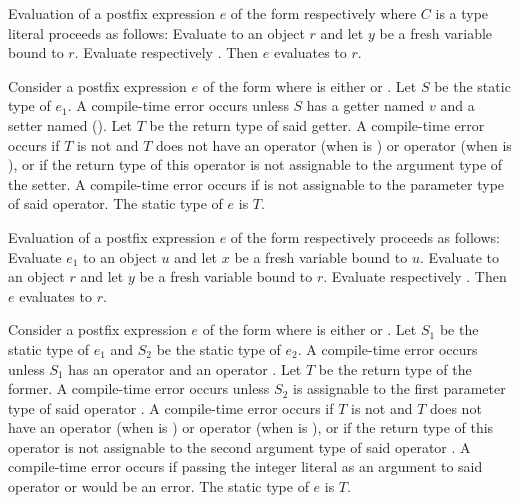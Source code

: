 \documentclass[makeidx]{article}
\begin{document}
{\LMHash{}%
Evaluation of a postfix expression $e$
of the form  respectively 
where $C$ is a type literal proceeds as follows:
Evaluate  to an object $r$
and let $y$ be a fresh variable bound to $r$.
Evaluate  respectively .
Then $e$ evaluates to $r$.
\EndCase

\LMHash{}%
Consider a postfix expression $e$ of the form 
where \op{} is either \lit{++} or \lit{-{}-}.
Let $S$ be the static type of $e_1$.
A compile-time error occurs unless $S$ has
a getter named $v$ and a setter named 
().
Let $T$ be the return type of said getter.
A compile-time error occurs if $T$ is not \DYNAMIC{}
and $T$ does not have an operator \lit{+} (when \op{} is \lit{++})
or operator \lit{-} (when \op{} is \lit{-{}-}),
or if the return type of this operator is not assignable to
the argument type of the setter.
A compile-time error occurs if  is not assignable to
the parameter type of said operator.
The static type of $e$ is $T$.

\LMHash{}%
Evaluation of a postfix expression $e$
of the form  respectively 
proceeds as follows:
Evaluate $e_1$ to an object $u$ and let $x$ be a fresh variable bound to $u$.
Evaluate  to an object $r$
and let $y$ be a fresh variable bound to $r$.
Evaluate  respectively .
Then $e$ evaluates to $r$.
\EndCase

\LMHash{}%
Consider a postfix expression $e$ of the form 
where \op{} is either \lit{++} or \lit{-{}-}.
Let $S_1$ be the static type of $e_1$
and $S_2$ be the static type of $e_2$.
A compile-time error occurs unless $S_1$ has
an operator \lit{[]} and an operator \lit{[]=}.
Let $T$ be the return type of the former.
A compile-time error occurs unless $S_2$ is assignable to
the first parameter type of said operator \lit{[]=}.
A compile-time error occurs if $T$ is not \DYNAMIC{}
and $T$ does not have an operator \lit{+} (when \op{} is \lit{++})
or operator \lit{-} (when \op{} is \lit{-{}-}),
or if the return type of this operator is not assignable to
the second argument type of said operator \lit{[]=}.
A compile-time error occurs if passing the integer literal 
as an argument to said operator \lit{+} or \lit{-} would be an error.
The static type of $e$ is $T$.

}
\end{document}
